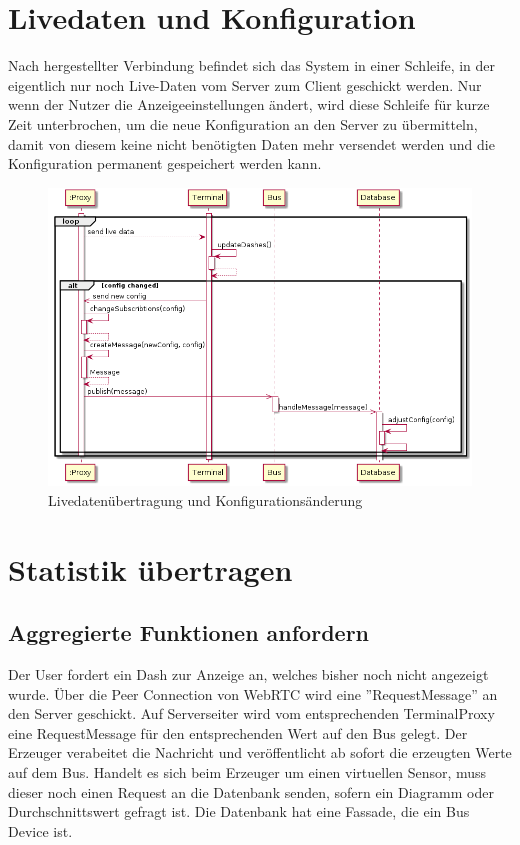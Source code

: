 \documentclass[entwurf.tex]{subfiles}
\begin{document}
  	\section{Livedaten und Konfiguration}
  	\label{Sequence:LiveDataNewConfig}
  		Nach hergestellter Verbindung befindet sich das System in einer Schleife, in der eigentlich nur noch Live-Daten vom Server zum Client geschickt werden. Nur wenn der Nutzer die Anzeigeeinstellungen ändert, wird diese Schleife für kurze Zeit unterbrochen, um die neue Konfiguration an den Server zu übermitteln, damit von diesem keine nicht benötigten Daten mehr versendet werden und die Konfiguration permanent gespeichert werden kann.
  		\begin{figure}[H]
  			\begin{center}
 				\includegraphics[width=\textwidth]{diagrams/ChangeDashConfig.png}
  				\caption{Livedatenübertragung und Konfigurationsänderung}
  			\end{center}
  		\end{figure}
  		
  	\newpage
  	\section{Statistik übertragen}
  		\subsection{Aggregierte Funktionen anfordern} \label{vsseq}

      Der User fordert ein Dash zur Anzeige an, welches bisher noch nicht angezeigt wurde. Über die Peer Connection von WebRTC wird eine ''RequestMessage'' an den Server geschickt. Auf Serverseiter wird vom entsprechenden TerminalProxy eine RequestMessage für den entsprechenden Wert auf den Bus gelegt. Der Erzeuger verabeitet die Nachricht und veröffentlicht ab sofort die erzeugten Werte auf dem Bus. Handelt es sich beim Erzeuger um einen virtuellen Sensor, muss dieser noch einen Request an die Datenbank senden, sofern ein Diagramm oder Durchschnittswert gefragt ist. Die Datenbank hat eine Fassade, die ein Bus Device ist.
\end{document}
